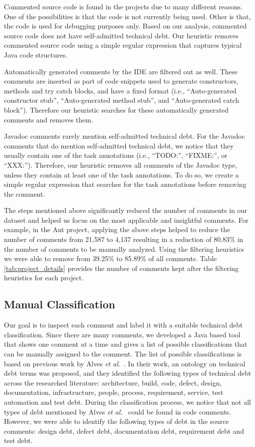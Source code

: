 Commented source code is found in the projects due to many different reasons. One of the possibilities is that the code is not currently being used. Other is that, the code is used for debugging purposes only. Based on our analysis, commented source code does not have self-admitted technical debt. Our heuristic removes commented source code using a simple regular expression that captures typical Java code structures.

Automatically generated comments by the IDE are filtered out as well. These comments are inserted as part of code snippets used to generate constructors, methods and try catch blocks, and have a fixed format (i.e., ``Auto-generated constructor stub'', ``Auto-generated method stub'', and ``Auto-generated catch block''). Therefore our heuristic searches for these automatically generated comments and removes them. 

Javadoc comments rarely mention self-admitted technical debt. For the Javadoc comments that do mention self-admitted technical debt, we notice that they usually contain one of the task annotations (i.e., ``TODO:'', ``FIXME:'', or ``XXX:''). Therefore, our heuristic removes all comments of the Javadoc type, unless they contain at least one of the task annotations.  To do so, we create a simple regular expression that searches for the task annotations before removing the comment.  

The steps mentioned above significantly reduced the number of comments in our dataset and helped us focus on the most applicable and insightful comments. For example, in the Ant project, applying the above steps helped to reduce the number of comments from 21,587 to 4,137 resulting in a reduction of 80.83\% in the number of comments to be manually analyzed. Using the filtering heuristics we were able to remove from 39.25\% to 85.89\% of all comments. Table \ref{tab:project_details} provides the number of comments kept after the filtering heuristics for each project.

\subsection{Manual Classification}
\label{sub:manual_classification}

Our goal is to inspect each comment and label it with a suitable technical debt classification. Since there are many comments, we developed a Java based tool that shows one comment at a time and gives a list of possible classifications that can be manually assigned to the comment. The list of possible classifications is based on previous work by Alves \textit{et al.}~\cite{Alves2014MTD}. In their work, an ontology on technical debt terms was proposed, and they identified the following types of technical debt across the researched literature: architecture, build, code, defect, design, documentation, infrastructure, people, process, requirement, service, test automation and test debt. During the classification process, we notice that not all types of debt mentioned by Alves \emph{et al.}~\cite{Alves2014MTD} could be found in code comments. However, we were able to identify the following types of debt in the source comments: design debt, defect debt, documentation debt, requirement debt and test debt. 

